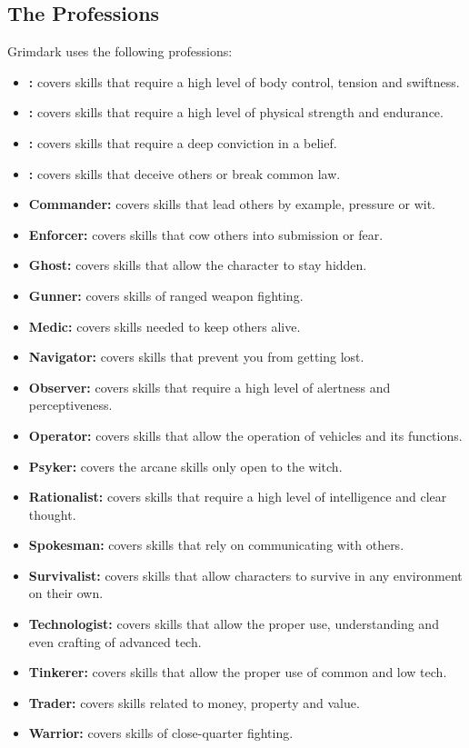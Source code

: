 \subsection{The Professions}
Grimdark uses the following professions:
\begin{itemize}
	\item \textbf{:} covers skills that require a high level of body control, tension and swiftness.
	\item \textbf{:} covers skills that require a high level of physical strength and endurance.
	\item \textbf{:} covers skills that require a deep conviction in a belief.
	\item \textbf{:} covers skills that deceive others or break common law.
	\item \textbf{Commander:} covers skills that lead others by example, pressure or wit.
	\item \textbf{Enforcer:} covers skills that cow others into submission or fear.
	\item \textbf{Ghost:} covers skills that allow the character to stay hidden.
	\item \textbf{Gunner:} covers skills of ranged weapon fighting.
	\item \textbf{Medic:} covers skills needed to keep others alive.
	\item \textbf{Navigator:} covers skills that prevent you from getting lost.
	\item \textbf{Observer:} covers skills that require a high level of alertness and perceptiveness.
	\item \textbf{Operator:} covers skills that allow the operation of vehicles and its functions.
	\item \textbf{Psyker:} covers the arcane skills only open to the witch.
	\item \textbf{Rationalist:} covers skills that require a high level of intelligence and clear thought.
	\item \textbf{Spokesman:} covers skills that rely on communicating with others.
	\item \textbf{Survivalist:} covers skills that allow characters to survive in any environment on their own.
	\item \textbf{Technologist:} covers skills that allow the proper use, understanding and even crafting of advanced tech.
	\item \textbf{Tinkerer:} covers skills that allow the proper use of common and low tech.
	\item \textbf{Trader:} covers skills related to money, property and value.
	\item \textbf{Warrior:} covers skills of close-quarter fighting.
\end{itemize}


